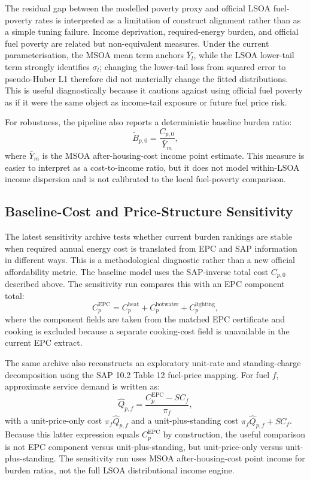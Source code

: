 The residual gap between the modelled poverty proxy and official LSOA fuel-poverty rates is interpreted as a limitation of construct alignment rather than as a simple tuning failure. Income deprivation, required-energy burden, and official fuel poverty are related but non-equivalent measures. Under the current parameterisation, the MSOA mean term anchors $\bar{Y}_l$, while the LSOA lower-tail term strongly identifies $\sigma_l$; changing the lower-tail loss from squared error to pseudo-Huber L1 therefore did not materially change the fitted distributions. This is useful diagnostically because it cautions against using official fuel poverty as if it were the same object as income-tail exposure or future fuel price risk.

For robustness, the pipeline also reports a deterministic baseline burden ratio:
\begin{equation}
\widetilde{B}_{p,0}=\frac{C_{p,0}}{\bar{Y}_m},
\end{equation}
where $\bar{Y}_m$ is the MSOA after-housing-cost income point estimate. This measure is easier to interpret as a cost-to-income ratio, but it does not model within-LSOA income dispersion and is not calibrated to the local fuel-poverty comparison.

\subsection{Baseline-Cost and Price-Structure Sensitivity}

The latest sensitivity archive tests whether current burden rankings are stable when required annual energy cost is translated from EPC and SAP information in different ways. This is a methodological diagnostic rather than a new official affordability metric. The baseline model uses the SAP-inverse total cost $C_{p,0}$ described above. The sensitivity run compares this with an EPC component total:
\begin{equation}
C^{\mathrm{EPC}}_{p}=C^{\mathrm{heat}}_{p}+C^{\mathrm{hotwater}}_{p}+C^{\mathrm{lighting}}_{p},
\end{equation}
where the component fields are taken from the matched EPC certificate and cooking is excluded because a separate cooking-cost field is unavailable in the current EPC extract.

The same archive also reconstructs an exploratory unit-rate and standing-charge decomposition using the SAP 10.2 Table 12 fuel-price mapping. For fuel $f$, approximate service demand is written as:
\begin{equation}
\widehat{Q}_{p,f}=\frac{C^{\mathrm{EPC}}_{p}-SC_f}{\pi_f},
\end{equation}
with a unit-price-only cost $\pi_f\widehat{Q}_{p,f}$ and a unit-plus-standing cost $\pi_f\widehat{Q}_{p,f}+SC_f$. Because this latter expression equals $C^{\mathrm{EPC}}_{p}$ by construction, the useful comparison is not EPC component versus unit-plus-standing, but unit-price-only versus unit-plus-standing. The sensitivity run uses MSOA after-housing-cost point income for burden ratios, not the full LSOA distributional income engine.

